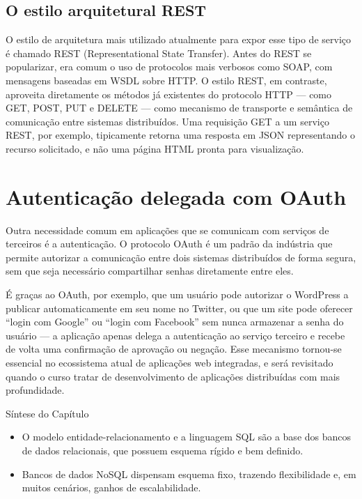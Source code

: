 \subsection{O estilo arquitetural REST}

O estilo de arquitetura mais utilizado atualmente para expor esse tipo de serviço é chamado REST (Representational State Transfer). Antes do REST se popularizar, era comum o uso de protocolos mais verbosos como SOAP, com mensagens baseadas em WSDL sobre HTTP. O estilo REST, em contraste, aproveita diretamente os métodos já existentes do protocolo HTTP — como GET, POST, PUT e DELETE — como mecanismo de transporte e semântica de comunicação entre sistemas distribuídos. Uma requisição GET a um serviço REST, por exemplo, tipicamente retorna uma resposta em JSON representando o recurso solicitado, e não uma página HTML pronta para visualização.

\section{Autenticação delegada com OAuth}

Outra necessidade comum em aplicações que se comunicam com serviços de terceiros é a autenticação. O protocolo OAuth é um padrão da indústria que permite autorizar a comunicação entre dois sistemas distribuídos de forma segura, sem que seja necessário compartilhar senhas diretamente entre eles.

É graças ao OAuth, por exemplo, que um usuário pode autorizar o WordPress a publicar automaticamente em seu nome no Twitter, ou que um site pode oferecer “login com Google” ou “login com Facebook” sem nunca armazenar a senha do usuário — a aplicação apenas delega a autenticação ao serviço terceiro e recebe de volta uma confirmação de aprovação ou negação. Esse mecanismo tornou-se essencial no ecossistema atual de aplicações web integradas, e será revisitado quando o curso tratar de desenvolvimento de aplicações distribuídas com mais profundidade.

Síntese do Capítulo

\begin{itemize}
  \item O modelo entidade-relacionamento e a linguagem SQL são a base dos bancos de dados relacionais, que possuem esquema rígido e bem definido.
\end{itemize}

\begin{itemize}
  \item Bancos de dados NoSQL dispensam esquema fixo, trazendo flexibilidade e, em muitos cenários, ganhos de escalabilidade.
\end{itemize}

